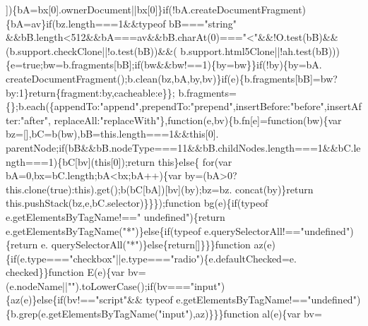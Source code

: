 \begin{DoxyCode}
{      ])\{bA=bx[0].ownerDocument||bx[0]\}\textcolor{keywordflow}{if}(!bA.createDocumentFragment)\{bA=av\}\textcolor{keywordflow}{if}(bz.length===1&&typeof bB===\textcolor{stringliteral}{"string"}
      &&bB.length<512&&bA===av&&bB.charAt(0)===\textcolor{stringliteral}{"<"}&&!O.test(bB)&&(b.support.checkClone||!o.test(bB))&&(
      b.support.html5Clone||!ah.test(bB)))\{e=\textcolor{keyword}{true};bw=b.fragments[bB];\textcolor{keywordflow}{if}(bw&&bw!==1)\{by=bw\}\}\textcolor{keywordflow}{if}(!by)\{by=bA.
      createDocumentFragment();b.clean(bz,bA,by,bv)\}\textcolor{keywordflow}{if}(e)\{b.fragments[bB]=bw?by:1\}\textcolor{keywordflow}{return}\{fragment:by,cacheable:e\}\};
      b.fragments=\{\};b.each(\{appendTo:\textcolor{stringliteral}{"append"},prependTo:\textcolor{stringliteral}{"prepend"},insertBefore:\textcolor{stringliteral}{"before"},insertAfter:\textcolor{stringliteral}{"after"},
      replaceAll:\textcolor{stringliteral}{"replaceWith"}\},\textcolor{keyword}{function}(e,bv)\{b.fn[e]=\textcolor{keyword}{function}(bw)\{var bz=[],bC=b(bw),bB=this.length===1&&\textcolor{keyword}{this}[0].
      parentNode;\textcolor{keywordflow}{if}(bB&&bB.nodeType===11&&bB.childNodes.length===1&&bC.length===1)\{bC[bv](\textcolor{keyword}{this}[0]);\textcolor{keywordflow}{return} \textcolor{keyword}{this}\}\textcolor{keywordflow}{else}\{\textcolor{keywordflow}{
      for}(var bA=0,bx=bC.length;bA<bx;bA++)\{var by=(bA>0?this.clone(\textcolor{keyword}{true}):this).get();b(bC[bA])[bv](by);bz=bz.
      concat(by)\}\textcolor{keywordflow}{return} this.pushStack(bz,e,bC.selector)\}\}\});\textcolor{keyword}{function} bg(e)\{\textcolor{keywordflow}{if}(typeof e.getElementsByTagName!==\textcolor{stringliteral}{"
      undefined"})\{\textcolor{keywordflow}{return} e.getElementsByTagName(\textcolor{stringliteral}{"*"})\}\textcolor{keywordflow}{else}\{\textcolor{keywordflow}{if}(typeof e.querySelectorAll!==\textcolor{stringliteral}{"undefined"})\{\textcolor{keywordflow}{return} e.
      querySelectorAll(\textcolor{stringliteral}{"*"})\}\textcolor{keywordflow}{else}\{\textcolor{keywordflow}{return}[]\}\}\}\textcolor{keyword}{function} az(e)\{\textcolor{keywordflow}{if}(e.type===\textcolor{stringliteral}{"checkbox"}||e.type===\textcolor{stringliteral}{"radio"})\{e.defaultChecked=e.
      checked\}\}\textcolor{keyword}{function} E(e)\{var bv=(e.nodeName||\textcolor{stringliteral}{""}).toLowerCase();\textcolor{keywordflow}{if}(bv===\textcolor{stringliteral}{"input"})\{az(e)\}\textcolor{keywordflow}{else}\{\textcolor{keywordflow}{if}(bv!==\textcolor{stringliteral}{"script"}&&
      typeof e.getElementsByTagName!==\textcolor{stringliteral}{"undefined"})\{b.grep(e.getElementsByTagName(\textcolor{stringliteral}{"input"}),az)\}\}\}\textcolor{keyword}{function} al(e)\{var bv=
}
\end{DoxyCode}
